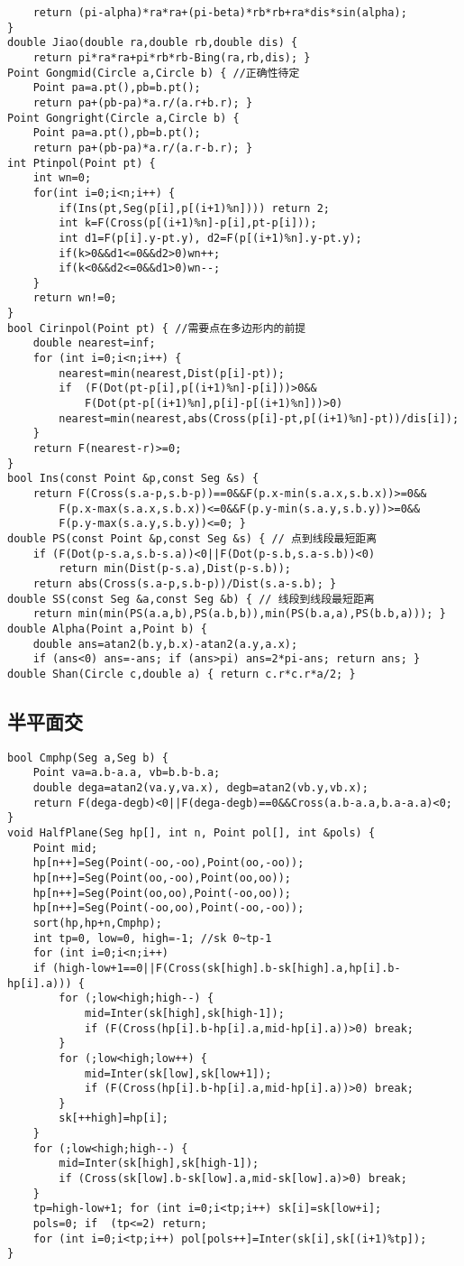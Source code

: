 \documentclass[landscape,a4paper]{article}
\begin{document}
\begin{lstlisting}
	return (pi-alpha)*ra*ra+(pi-beta)*rb*rb+ra*dis*sin(alpha);
}
double Jiao(double ra,double rb,double dis) {
	return pi*ra*ra+pi*rb*rb-Bing(ra,rb,dis); }
Point Gongmid(Circle a,Circle b) { //正确性待定
	Point pa=a.pt(),pb=b.pt();
	return pa+(pb-pa)*a.r/(a.r+b.r); }
Point Gongright(Circle a,Circle b) {
	Point pa=a.pt(),pb=b.pt();
	return pa+(pb-pa)*a.r/(a.r-b.r); }
int Ptinpol(Point pt) {
	int wn=0;
    for(int i=0;i<n;i++) {
        if(Ins(pt,Seg(p[i],p[(i+1)%n]))) return 2;
        int k=F(Cross(p[(i+1)%n]-p[i],pt-p[i]));
        int d1=F(p[i].y-pt.y), d2=F(p[(i+1)%n].y-pt.y);
        if(k>0&&d1<=0&&d2>0)wn++;
        if(k<0&&d2<=0&&d1>0)wn--;
    }
    return wn!=0;
}
bool Cirinpol(Point pt) { //需要点在多边形内的前提
	double nearest=inf;
	for (int i=0;i<n;i++) {
		nearest=min(nearest,Dist(p[i]-pt));
		if  (F(Dot(pt-p[i],p[(i+1)%n]-p[i]))>0&&
			F(Dot(pt-p[(i+1)%n],p[i]-p[(i+1)%n]))>0)
		nearest=min(nearest,abs(Cross(p[i]-pt,p[(i+1)%n]-pt))/dis[i]);
	}
	return F(nearest-r)>=0;
}
bool Ins(const Point &p,const Seg &s) {
	return F(Cross(s.a-p,s.b-p))==0&&F(p.x-min(s.a.x,s.b.x))>=0&&
		F(p.x-max(s.a.x,s.b.x))<=0&&F(p.y-min(s.a.y,s.b.y))>=0&&
		F(p.y-max(s.a.y,s.b.y))<=0; }
double PS(const Point &p,const Seg &s) { // 点到线段最短距离
	if (F(Dot(p-s.a,s.b-s.a))<0||F(Dot(p-s.b,s.a-s.b))<0)
		return min(Dist(p-s.a),Dist(p-s.b));
	return abs(Cross(s.a-p,s.b-p))/Dist(s.a-s.b); }
double SS(const Seg &a,const Seg &b) { // 线段到线段最短距离
	return min(min(PS(a.a,b),PS(a.b,b)),min(PS(b.a,a),PS(b.b,a))); }
double Alpha(Point a,Point b) {
	double ans=atan2(b.y,b.x)-atan2(a.y,a.x);
	if (ans<0) ans=-ans; if (ans>pi) ans=2*pi-ans; return ans; }
double Shan(Circle c,double a) { return c.r*c.r*a/2; }
\end{lstlisting}

\subsection{半平面交}
\begin{lstlisting}
bool Cmphp(Seg a,Seg b) {
	Point va=a.b-a.a, vb=b.b-b.a;
    double dega=atan2(va.y,va.x), degb=atan2(vb.y,vb.x);
	return F(dega-degb)<0||F(dega-degb)==0&&Cross(a.b-a.a,b.a-a.a)<0;
}
void HalfPlane(Seg hp[], int n, Point pol[], int &pols) {
	Point mid;
	hp[n++]=Seg(Point(-oo,-oo),Point(oo,-oo));
	hp[n++]=Seg(Point(oo,-oo),Point(oo,oo));
	hp[n++]=Seg(Point(oo,oo),Point(-oo,oo));
	hp[n++]=Seg(Point(-oo,oo),Point(-oo,-oo));
	sort(hp,hp+n,Cmphp);
	int tp=0, low=0, high=-1; //sk 0~tp-1
	for (int i=0;i<n;i++)
	if (high-low+1==0||F(Cross(sk[high].b-sk[high].a,hp[i].b-hp[i].a))) {
		for (;low<high;high--) {
			mid=Inter(sk[high],sk[high-1]);
			if (F(Cross(hp[i].b-hp[i].a,mid-hp[i].a))>0) break;
		}
		for (;low<high;low++) {
			mid=Inter(sk[low],sk[low+1]);
			if (F(Cross(hp[i].b-hp[i].a,mid-hp[i].a))>0) break;
		}
		sk[++high]=hp[i];
	}
	for (;low<high;high--) {
		mid=Inter(sk[high],sk[high-1]);
		if (Cross(sk[low].b-sk[low].a,mid-sk[low].a)>0) break;
	}
	tp=high-low+1; for (int i=0;i<tp;i++) sk[i]=sk[low+i];
	pols=0; if  (tp<=2) return;
	for (int i=0;i<tp;i++) pol[pols++]=Inter(sk[i],sk[(i+1)%tp]);
}
\end{lstlisting}
\end{document}
